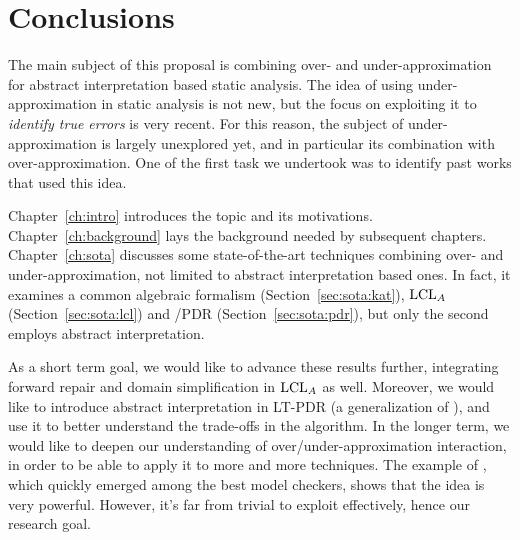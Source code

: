 
\chapter{Conclusions}\label{ch:conclusions}
The main subject of this proposal is combining over- and under-approximation for abstract interpretation based static analysis. The idea of using under-approximation in static analysis is not new, but the focus on exploiting it to \emph{identify true errors} is very recent. For this reason, the subject of under-approximation is largely unexplored yet, and in particular its combination with over-approximation. One of the first task we undertook was to identify past works that used this idea.

Chapter~\ref{ch:intro} introduces the topic and its motivations. Chapter~\ref{ch:background} lays the background needed by subsequent chapters.
Chapter~\ref{ch:sota} discusses some state-of-the-art techniques combining over- and under-approximation, not limited to abstract interpretation based ones. In fact, it examines a common algebraic formalism (Section~\ref{sec:sota:kat}), $\text{LCL}_A$ (Section~\ref{sec:sota:lcl}) and /PDR (Section~\ref{sec:sota:pdr}), but only the second employs abstract interpretation.

As a short term goal, we would like to advance these results further, integrating forward repair and domain simplification in $\text{LCL}_A$ as well. Moreover, we would like to introduce abstract interpretation in LT-PDR (a generalization of ), and use it to better understand the trade-offs in the algorithm.
In the longer term, we would like to deepen our understanding of over/under-approximation interaction, in order to be able to apply it to more and more techniques. The example of , which quickly emerged among the best model checkers, shows that the idea is very powerful. However, it's far from trivial to exploit effectively, hence our research goal.